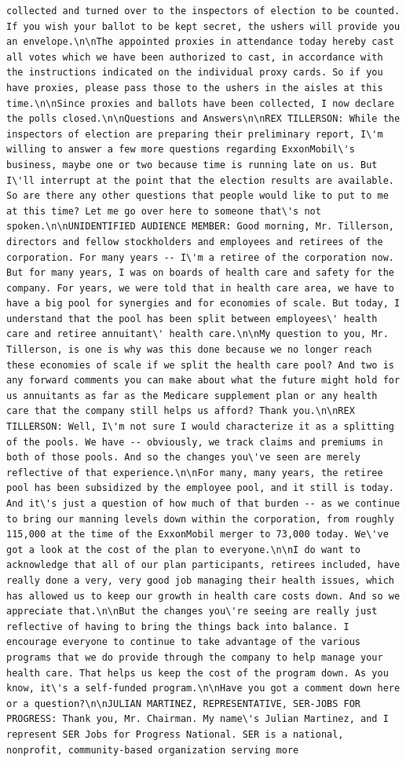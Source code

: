\documentclass[
  letterpaper,
  DIV=11,
  numbers=noendperiod]{scrreprt}
\begin{document}
\begin{verbatim}
collected and turned over to the inspectors of election to be counted. If you wish your ballot to be kept secret, the ushers will provide you an envelope.\n\nThe appointed proxies in attendance today hereby cast all votes which we have been authorized to cast, in accordance with the instructions indicated on the individual proxy cards. So if you have proxies, please pass those to the ushers in the aisles at this time.\n\nSince proxies and ballots have been collected, I now declare the polls closed.\n\nQuestions and Answers\n\nREX TILLERSON: While the inspectors of election are preparing their preliminary report, I\'m willing to answer a few more questions regarding ExxonMobil\'s business, maybe one or two because time is running late on us. But I\'ll interrupt at the point that the election results are available. So are there any other questions that people would like to put to me at this time? Let me go over here to someone that\'s not spoken.\n\nUNIDENTIFIED AUDIENCE MEMBER: Good morning, Mr. Tillerson, directors and fellow stockholders and employees and retirees of the corporation. For many years -- I\'m a retiree of the corporation now. But for many years, I was on boards of health care and safety for the company. For years, we were told that in health care area, we have to have a big pool for synergies and for economies of scale. But today, I understand that the pool has been split between employees\' health care and retiree annuitant\' health care.\n\nMy question to you, Mr. Tillerson, is one is why was this done because we no longer reach these economies of scale if we split the health care pool? And two is any forward comments you can make about what the future might hold for us annuitants as far as the Medicare supplement plan or any health care that the company still helps us afford? Thank you.\n\nREX TILLERSON: Well, I\'m not sure I would characterize it as a splitting of the pools. We have -- obviously, we track claims and premiums in both of those pools. And so the changes you\'ve seen are merely reflective of that experience.\n\nFor many, many years, the retiree pool has been subsidized by the employee pool, and it still is today. And it\'s just a question of how much of that burden -- as we continue to bring our manning levels down within the corporation, from roughly 115,000 at the time of the ExxonMobil merger to 73,000 today. We\'ve got a look at the cost of the plan to everyone.\n\nI do want to acknowledge that all of our plan participants, retirees included, have really done a very, very good job managing their health issues, which has allowed us to keep our growth in health care costs down. And so we appreciate that.\n\nBut the changes you\'re seeing are really just reflective of having to bring the things back into balance. I encourage everyone to continue to take advantage of the various programs that we do provide through the company to help manage your health care. That helps us keep the cost of the program down. As you know, it\'s a self-funded program.\n\nHave you got a comment down here or a question?\n\nJULIAN MARTINEZ, REPRESENTATIVE, SER-JOBS FOR PROGRESS: Thank you, Mr. Chairman. My name\'s Julian Martinez, and I represent SER Jobs for Progress National. SER is a national, nonprofit, community-based organization serving more 
\end{verbatim}
\end{document}
